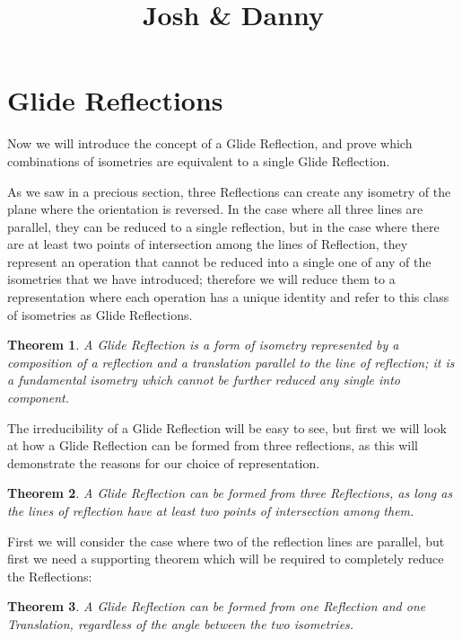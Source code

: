 \documentclass[11pt]{article}
\newtheorem{theorem}{Theorem}[section]
\theoremstyle{definition}
\begin{document}


\title{Josh & Danny}

\maketitle

\section{Glide Reflections}
Now we will introduce the concept of a Glide Reflection, and prove which
combinations of isometries are equivalent to a single Glide Reflection.

As we saw in a precious section, three Reflections can create any isometry of
the plane where the orientation is reversed. In the case where all three lines
are parallel, they can be reduced to a single reflection, but in the case where
there are at least two points of intersection among the lines of Reflection,
they represent an operation that cannot be reduced into a single one of any of
the isometries that we have introduced; therefore we will reduce them to a
representation where each operation has a unique identity and refer to this
class of isometries as Glide Reflections.

\begin{theorem}\label{Glide Reflection}
  A Glide Reflection is a form of isometry represented by a composition of a
reflection and a translation parallel to the line of reflection; it is a
fundamental isometry which cannot be further reduced any single into component.
\end{theorem}

The irreducibility of a Glide Reflection will be easy to see, but first we will
look at how a Glide Reflection can be formed from three reflections, as this
will demonstrate the reasons for our choice of representation.

\begin{theorem}\label{3 Reflections form a Glide Reflection}
  A Glide Reflection can be formed from three Reflections, as long as the
  lines of reflection have at least two points of intersection among them.
\end{theorem}

First we will consider the case where two of the reflection lines are parallel,
but first we need a supporting theorem which will be required to completely
reduce the Reflections:

\begin{theorem}\label{Glide Reflection from a Reflection and a Translation}
  A Glide Reflection can be formed from one Reflection and one Translation,
  regardless of the angle between the two isometries.
\end{theorem}
\end{document}
